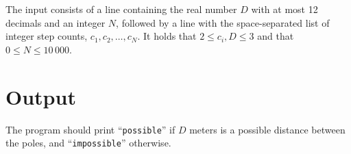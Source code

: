 The input consists of a line containing the real number $D$ with at most 12 decimals and an integer $N$, followed by a line with the space-separated list of integer step counts, $c_1, c_2, \ldots, c_N$. It holds that $2 \leq c_i, D \leq 3$ and that $0 \leq N \leq 10\,000$.

\section*{Output}
The program should print ``\verb|possible|'' if $D$ meters is a possible distance between the poles, and
``\verb|impossible|'' otherwise.

